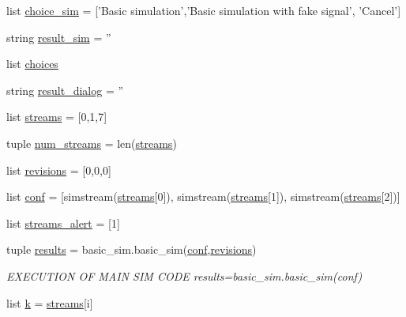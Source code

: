 \begin{DoxyCompactItemize}
\item 
list \hyperlink{namespacerun__basic__sim_a06535363754eeccfe11eb9add16d960c}{choice\-\_\-sim} = \mbox{[}'Basic simulation','Basic simulation with fake signal', 'Cancel'\mbox{]}
\item 
string \hyperlink{namespacerun__basic__sim_ab3077fbde3dc20f73989559c65d85746}{result\-\_\-sim} = ''
\item 
list \hyperlink{namespacerun__basic__sim_a72da00244bdf1f5b3abed724ceadc7ee}{choices}
\item 
string \hyperlink{namespacerun__basic__sim_a826e82f3f93e021f977571ad2f1aa79f}{result\-\_\-dialog} = ''
\item 
list \hyperlink{namespacerun__basic__sim_a69d19ea95cd33b0c8247e0329ad681fd}{streams} = \mbox{[}0,1,7\mbox{]}
\item 
tuple \hyperlink{namespacerun__basic__sim_a6e233ceb12c89f47c3f5d46fbe0a97c0}{num\-\_\-streams} = len(\hyperlink{namespacerun__basic__sim_a69d19ea95cd33b0c8247e0329ad681fd}{streams})
\item 
list \hyperlink{namespacerun__basic__sim_a10341d73d6ae4054f329f8df62c3d883}{revisions} = \mbox{[}0,0,0\mbox{]}
\item 
list \hyperlink{namespacerun__basic__sim_ae462ec6ba5f539a8854681e7c134eff7}{conf} = \mbox{[}simstream(\hyperlink{namespacerun__basic__sim_a69d19ea95cd33b0c8247e0329ad681fd}{streams}\mbox{[}0\mbox{]}), simstream(\hyperlink{namespacerun__basic__sim_a69d19ea95cd33b0c8247e0329ad681fd}{streams}\mbox{[}1\mbox{]}), simstream(\hyperlink{namespacerun__basic__sim_a69d19ea95cd33b0c8247e0329ad681fd}{streams}\mbox{[}2\mbox{]})\mbox{]}
\item 
list \hyperlink{namespacerun__basic__sim_adacbf2216b90ed8744cd74181ab5e1fe}{streams\-\_\-alert} = \mbox{[}1\mbox{]}
\item 
tuple \hyperlink{namespacerun__basic__sim_a1bf560184f22725eb4ccb144ad176478}{results} = basic\-\_\-sim.\-basic\-\_\-sim(\hyperlink{namespacerun__basic__sim_ae462ec6ba5f539a8854681e7c134eff7}{conf},\hyperlink{namespacerun__basic__sim_a10341d73d6ae4054f329f8df62c3d883}{revisions})
\begin{DoxyCompactList}\small\item\em E\-X\-E\-C\-U\-T\-I\-O\-N O\-F M\-A\-I\-N S\-I\-M C\-O\-D\-E results=basic\-\_\-sim.\-basic\-\_\-sim(conf) \end{DoxyCompactList}\item 
list \hyperlink{namespacerun__basic__sim_ab26de909b870c8e4b6e927e4f8973eea}{k} = \hyperlink{namespacerun__basic__sim_a69d19ea95cd33b0c8247e0329ad681fd}{streams}\mbox{[}i\mbox{]}
\end{DoxyCompactItemize}


